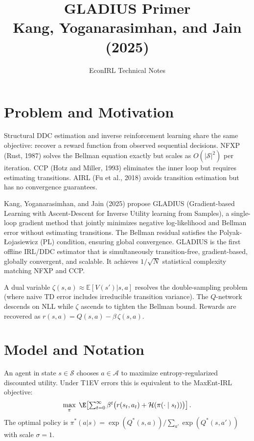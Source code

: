 \documentclass[11pt]{article}
\title{GLADIUS Primer\\[2pt]
\large Kang, Yoganarasimhan, and Jain (2025)}
\author{EconIRL Technical Notes}
\date{}
\begin{document}
\maketitle
\vspace{-1em}

\section{Problem and Motivation}

Structural DDC estimation and inverse reinforcement learning share the same objective: recover a reward function from observed sequential decisions. NFXP (Rust, 1987) solves the Bellman equation exactly but scales as $O(|\mathcal{S}|^2)$ per iteration. CCP (Hotz and Miller, 1993) eliminates the inner loop but requires estimating transitions. AIRL (Fu et al., 2018) avoids transition estimation but has no convergence guarantees.

Kang, Yoganarasimhan, and Jain (2025) propose GLADIUS (Gradient-based Learning with Ascent-Descent for Inverse Utility learning from Samples), a single-loop gradient method that jointly minimizes negative log-likelihood and Bellman error without estimating transitions. The Bellman residual satisfies the Polyak-\L{}ojasiewicz (PL) condition, ensuring global convergence. GLADIUS is the first offline IRL/DDC estimator that is simultaneously transition-free, gradient-based, globally convergent, and scalable. It achieves $1/\sqrt{N}$ statistical complexity matching NFXP and CCP.

A dual variable $\zeta(s,a) \approx \mathbb{E}[V(s')|s,a]$ resolves the double-sampling problem (where naive TD error includes irreducible transition variance). The $Q$-network descends on NLL while $\zeta$ ascends to tighten the Bellman bound. Rewards are recovered as $r(s,a) = Q(s,a) - \beta\,\zeta(s,a)$.


\section{Model and Notation}

An agent in state $s \in \mathcal{S}$ chooses $a \in \mathcal{A}$ to maximize entropy-regularized discounted utility. Under T1EV errors this is equivalent to the MaxEnt-IRL objective:
\begin{equation}
\label{eq:objective}
\max_\pi \; \E\!\left[\textstyle\sum_{t=0}^{\infty} \beta^t \bigl(r(s_t, a_t) + \mathcal{H}(\pi(\cdot \mid s_t))\bigr)\right].
\end{equation}
The optimal policy is $\pi^*(a|s) = \exp(Q^*(s,a)) / \sum_{a'} \exp(Q^*(s,a'))$ with scale $\sigma = 1$.
\end{document}
